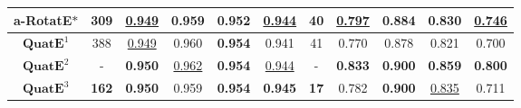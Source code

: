 \documentclass{article}
\begin{document}
\begin{table}[t]
\begin{tabular}{ccccccccccc}
a-RotatE$\ast$         & 309 &  \underline{0.949} & 0.959 &  0.952 & \underline{0.944} & 40 & \underline{0.797} & 0.884  & 0.830 & \underline{ 0.746 }\\ \midrule
$\textbf{QuatE}^1$ & 388 &\underline{0.949}& 0.960  & \textbf{0.954} & 0.941  & 41 &0.770 & 0.878 & 0.821 & 0.700 \\
$\textbf{QuatE}^2$ & - &\textbf{ 0.950} & \underline{0.962}  & \textbf{0.954} & \underline{0.944} & - & \textbf{0.833} &\textbf{0.900} & \textbf{0.859} & \textbf{0.800} \\
$\textbf{QuatE}^3$ &   \textbf{162} &  \textbf{ 0.950}  &     0.959   & \textbf{0.954}     &   \textbf{0.945}    &  \textbf{17}  &     0.782  &   \textbf{0.900}    &  \underline{0.835}   &    0.711    \\ \bottomrule
\end{tabular}
\vspace{-1em}
\label{table:old}
\end{table}
\end{document}
